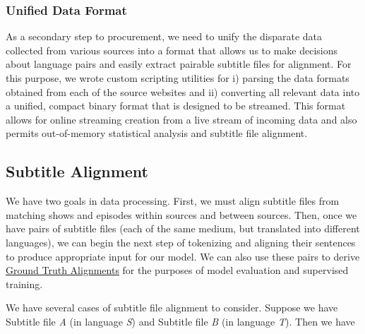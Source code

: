\documentclass[twoside,twocolumn]{article}
\begin{document}
\subsubsection{Unified Data Format}

As a secondary step to procurement, we need to unify the disparate data
collected from various sources into a format that allows us to make decisions
about language pairs and easily extract pairable subtitle files for alignment.
For this purpose, we wrote custom scripting utilities for i) parsing
the data formats obtained from each of the source websites and ii) converting
all relevant data into a unified, compact binary format that is designed to be
streamed. This format allows for online streaming creation from a live stream
of incoming data and also permits out-of-memory statistical analysis and
subtitle file alignment.


\subsection{Subtitle Alignment}
\label{subsec:subtitle-alignment}

We have two goals in data processing. First, we must align
subtitle files from matching shows and episodes within sources and between
sources. Then, once we have pairs of subtitle files (each of the same medium,
but translated into different languages), we can begin the next step of
tokenizing and aligning their sentences to produce appropriate input for
our model. We can also use these pairs to derive
\hyperref[subsec:ground-truth-alignments]{Ground Truth Alignments} for the
purposes of model evaluation and supervised training.

We have several cases of subtitle file alignment to consider. Suppose we have
Subtitle file \textit{A} (in language \textit{S}) and Subtitle file \textit{B}
(in language \textit{T}). Then we have
\end{document}
